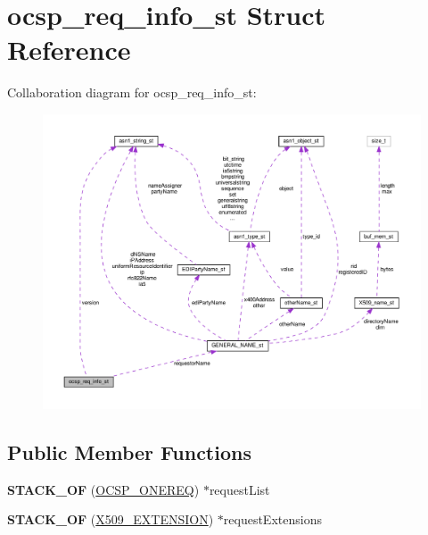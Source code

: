 \hypertarget{structocsp__req__info__st}{}\section{ocsp\+\_\+req\+\_\+info\+\_\+st Struct Reference}
\label{structocsp__req__info__st}


Collaboration diagram for ocsp\+\_\+req\+\_\+info\+\_\+st\+:
\nopagebreak
\begin{figure}[H]
\begin{center}
\leavevmode
\includegraphics[width=350pt]{structocsp__req__info__st__coll__graph}
\end{center}
\end{figure}
\subsection*{Public Member Functions}
\begin{DoxyCompactItemize}
\item 
\mbox{\label{structocsp__req__info__st_a426aa46bbaf15997a79cdcab9eda73b5}} 
{\bfseries S\+T\+A\+C\+K\+\_\+\+OF} (\hyperlink{structocsp__one__request__st}{O\+C\+S\+P\+\_\+\+O\+N\+E\+R\+EQ}) $\ast$request\+List
\item 
\mbox{\label{structocsp__req__info__st_acfed3cb49afe839e15256f27a4542897}} 
{\bfseries S\+T\+A\+C\+K\+\_\+\+OF} (\hyperlink{structX509__extension__st}{X509\+\_\+\+E\+X\+T\+E\+N\+S\+I\+ON}) $\ast$request\+Extensions
\end{DoxyCompactItemize}
